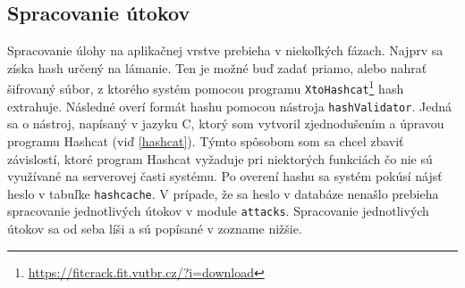 \documentclass[slovak]{fitthesis}
\begin{document}
\subsection{Spracovanie útokov}
Spracovanie úlohy na aplikačnej vrstve prebieha v niekoľkých fázach. Najprv sa získa hash určený na lámanie. Ten je možné buď zadať priamo, alebo nahrať šifrovaný súbor, z ktorého systém pomocou programu \texttt{XtoHashcat}\footnote{\url{https://fitcrack.fit.vutbr.cz/?i=download}} hash extrahuje. Následné overí formát hashu pomocou nástroja \texttt{hashValidator}. Jedná sa o nástroj, napísaný v jazyku C, ktorý som vytvoril zjednodušením a úpravou programu Hashcat (viď \ref{hashcat}). Týmto spôsobom som sa chcel zbaviť závislostí, ktoré program Hashcat vyžaduje pri niektorých funkciách čo nie sú využívané na serverovej časti systému. Po overení hashu sa systém pokúsí nájsť heslo v tabuľke \texttt{hashcache}. V prípade, že sa heslo v databáze nenašlo prebieha spracovanie jednotlivých útokov v module \texttt{attacks}. Spracovanie jednotlivých útokov sa od seba líši a sú popísané v zozname nižšie.
\end{document}
